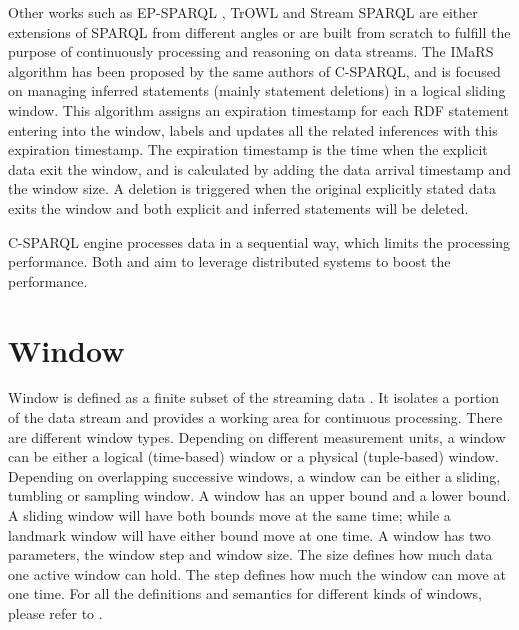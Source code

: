 Other works such as EP-SPARQL \cite{anicic2011ep}, TrOWL \cite{thomas2010trowl} and Stream SPARQL \cite{bolles2008streaming} are either extensions of SPARQL from different angles or are built from scratch to fulfill the purpose of continuously processing and reasoning on data streams.
The IMaRS \cite{barbieri2010incremental} algorithm has been proposed by the same authors of C-SPARQL, and is focused on managing inferred statements (mainly statement deletions) in a logical sliding window.
This algorithm assigns an expiration timestamp for each RDF statement entering into the window, labels and updates all the related inferences with this expiration timestamp.
The expiration timestamp is the time when the explicit data exit the window, and is calculated by adding the data arrival timestamp and the window size.
A deletion is triggered when the original explicitly stated data exits the window and both explicit and inferred statements will be deleted.

C-SPARQL engine processes data in a sequential way, which limits the processing performance. 
Both \cite{DBLP:journals/corr/RenC17} and \cite{DBLP:conf/semweb/RenCKKC16} aim to leverage distributed systems to boost the performance. 
%
\section{Window}
Window is defined as a finite subset of the streaming data \cite{patroumpas2006window}.
It isolates a portion of the data stream and provides a working area for continuous processing. 
There are different window types. 
Depending on different measurement units, a window can be either a logical (time-based) window or a physical (tuple-based) window.
Depending on overlapping successive windows, a window can be either a sliding, tumbling or sampling window. 
A window has an upper bound and a lower bound. 
A sliding window will have both bounds move at the same time; while a landmark window will have either bound move at one time.
A window has two parameters, the window step and window size. 
The size defines how much data one active window can hold. 
The step defines how much the window can move at one time.
For all the definitions and semantics for different kinds of windows, please refer to \cite{patroumpas2006window}. 

